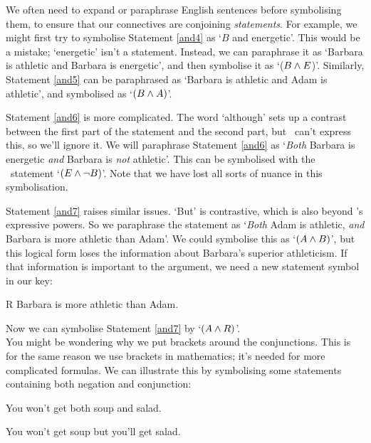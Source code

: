 \documentclass[PHIL101-Textbook.tex]{subfiles}
\begin{document}
We often need to expand or paraphrase English sentences before symbolising them, to ensure that our connectives are conjoining \emph{statements}. For example, we might first try to symbolise Statement \ref{and4} as `$B$ and energetic'. This would be a mistake; `energetic' isn't a statement. Instead, we can paraphrase it as `Barbara is athletic and Barbara is energetic', and then symbolise it as `($B \land E$)'. 
Similarly, Statement \ref{and5} can be paraphrased as `Barbara is athletic and Adam is athletic', and symbolised as `$(B\land A)$'.

Statement \ref{and6} is more complicated. The word `although' sets up a contrast between the first part of the statement and the second part, but \tfl\ can't express this, so we'll ignore it. We will paraphrase Statement \ref{and6} as `\emph{Both} Barbara is energetic \emph{and} Barbara is \emph{not} athletic'. This can be symbolised with the \tfl\ statement `$(E\land\neg B)$'. Note that we have lost all sorts of nuance in this symbolisation. %


Statement \ref{and7} raises similar issues. `But' is contrastive, which is also beyond \tfl's expressive powers. So we paraphrase the statement as `\emph{Both} Adam is athletic, \emph{and} Barbara is more athletic than Adam'. We could symbolise this as `$(A \land B)$', but this logical form loses the information about Barbara's superior athleticism. If that information is important to the argument, we need a new statement symbol in our key:
\begin{ekey}
\item[R] Barbara is more athletic than Adam.
\end{ekey}
\noindent Now we can symbolise Statement \ref{and7} by `$(A \land R)$'.\\

You might be wondering why we put brackets around the conjunctions. This is for the same reason we use brackets in mathematics; it's needed for more complicated formulas. We can illustrate this by symbolising some statements containing both negation and conjunction:
\begin{earg}
\item[\ex{negcon1}] You won't get both soup and salad.
\item[\ex{negcon2}] You won't get soup but you'll get salad.
\end{earg}
\end{document}
